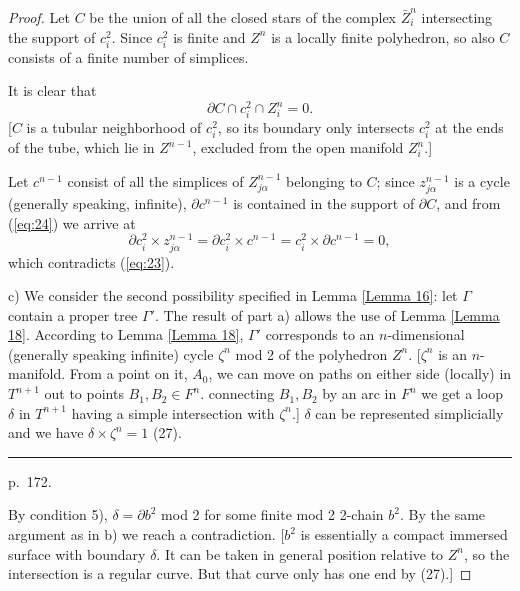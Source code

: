 \documentclass{amsart}
\theoremstyle{plain}
\theoremstyle{definition}
\begin{document}
\begin{proof}
Let $C$ be the union of all the closed stars of the complex
${\bar Z}^n_i$ intersecting the support of $c^2_i$. Since $c^2_i$
is finite and $Z^n$ is a locally finite polyhedron, so also $C$
consists of a finite number of simplices.

It is clear that
\begin{equation}\partial C \cap c^2_i \cap Z^n_i = 0. \label{eq:24}
\end{equation}
[$C$ is a tubular neighborhood of $c^2_i$, so its boundary only
intersects $c^2_i$ at the ends of the tube, which lie in $Z^{n-1}$,
excluded from the open manifold $Z^n_i$.]

Let $c^{n-1}$ consist of all the simplices of $Z^{n-1}_{j\alpha}$
belonging to $C$; since $z^{n-1}_{j\alpha}$ is a cycle (generally
speaking, infinite), $\partial c^{n-1}$ is contained in the support
of $\partial C$, and from (\ref{eq:24}) we arrive at
$$\partial c^2_i \times z^{n-1}_{j\alpha} = \partial c^2_i \times
c^{n-1} = c^2_i \times \partial c^{n-1} = 0,$$
which contradicts (\ref{eq:23}).

c) We consider the second possibility specified in Lemma \ref{Lemma 16}: let
$\Gamma$ contain a proper tree $\Gamma'$. The result of part
a) allows the use of Lemma \ref{Lemma 18}. According to Lemma \ref{Lemma 18},
$\Gamma'$ corresponds to an $n$-dimensional (generally
speaking infinite) cycle $\zeta^n$ mod 2 of the polyhedron
$Z^n$. [$\zeta^n$ is an $n$-manifold. From a point on it, $A_0$,
we can move on paths on either side (locally) in $T^{n+1}$ out
to points $B_1,B_2 \in F^n$. connecting $B_1,B_2$ by an arc in
$F^n$ we get a loop $\delta$ in $T^{n+1}$ having a simple
intersection with $\zeta^n$.] $\delta$ can be represented
simplicially and we have $\delta \times \zeta^n = 1$ (27).

\medskip
\hrule\smallskip
\noindent p.~172.
\medskip

By condition 5), $\delta = \partial b^2$ mod 2 for some finite
mod 2 2-chain $b^2$. By the same argument as in b) we reach a
contradiction. [$b^2$ is essentially a compact immersed surface
with boundary $\delta$. It can be taken in general position
relative to $Z^n$, so the intersection is a regular curve. But that
curve only has one end by (27).]
\end{proof}
\end{document}
